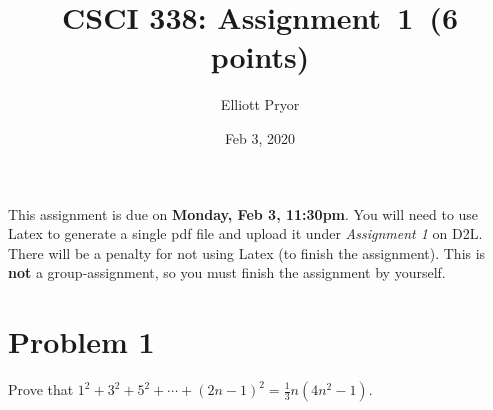 \documentclass[11pt]{article}
\begin{document}
\date{Feb 3, 2020}
\title{CSCI 338: Assignment~1~(6 points)}

\author{Elliott Pryor}


\maketitle

\noindent
This assignment is due on {\bf Monday, Feb 3, 11:30pm}. You will need to
use Latex to generate a single pdf file and upload it under {\em Assignment 1}
on D2L. There will be a penalty for not using Latex (to finish the assignment).
This is {\bf not} a group-assignment, so you must finish the assignment by
yourself.

\section*{Problem 1}

Prove that $1^2+3^2+5^2+\cdots+(2n-1)^2=\frac{1}{3}n(4n^2-1)$.
\newline
\end{document}
